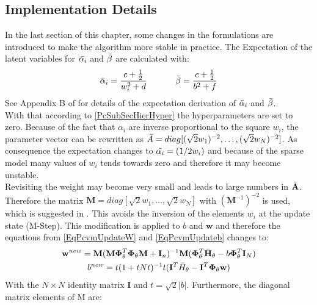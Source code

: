\subsection{Implementation Details}\label{PcSubSecImplementation}
In the last section of this chapter, some changes in the formulations are introduced to make the algorithm more stable in practice.
The Expectation of the latent variables for $\bar{\alpha_i}$ and $\bar{\beta}$ are calculated with:\cite{Chen.2009}
\begin{equation}\label{EqPcvmLatenHyp}
		\bar{\alpha}_i = \frac{c + \frac{1}{2}}{w_i^2 + d} \>\>\>\>\>\>\>\>\>\>\>\>\>\>\>
		\bar{\beta} = \frac{c + \frac{1}{2}}{b^2 + f}
\end{equation}
See Appendix B of \cite{Chen.2009} for details of the expectation derivation of $\bar{\alpha}_i$ and $\bar{\beta}$.\\
With that according to \ref{PcSubSecHierHyper} the hyperparameters are set to zero.
Because of the fact that $\alpha_i$ are inverse proportional to the square  $w_i$, the parameter vector can be rewritten as $\bar{A} = diag[(\sqrt{2}w_1)^{-2},\dots,(\sqrt{2}w_N)^{-2}]$.
As consequence the expectation changes to $\bar{\alpha_i} = (1/2w_i)$ and because of the sparse model many values of $w_i$ tends towards zero and therefore it may become unstable.\cite{Chen.2009}\\
Revisiting the weight may become very small and leads to large numbers in $\bar{\mathbf{A}}$. Therefore the matrix $\mathbf{M}=diag[\sqrt{2}w_1,\dots,\sqrt{2}w_N]$ with $(\mathbf{M}^{-1})^{-2}$ is used, which is suggested in \cite{Figueiredo.2003}.
This avoids the inversion of the elements $w_i$ at the update state (M-Step). This modification is applied to $b$ and $\mathbf{w}$ and therefore the equations from \ref{EqPcvmUpdateW} and \ref{EqPcvmUpdateb} changes to:\cite{Chen.2009}
\begin{equation}\label{EqPcvmStableUpdate}
	\begin{gathered}
	\mathbf{w}^{new} = \mathbf{M}(\mathbf{M \Phi}_\theta^T\mathbf{\Phi}_\theta\mathbf{M}+\mathbf{I}_n)^{-1} \mathbf{M}(\mathbf{\Phi}_\theta^T\bar{\mathbf{H}}_\theta - b \mathbf{\Phi}_\theta^T \mathbf{I}_N)\\
	b^{new} = t(1 + tNt)^{-1} t(\mathbf{I}^T\bar{H}_\theta-\mathbf{I}^T\mathbf{\Phi}_\theta\mathbf{w})
	\end{gathered}
\end{equation}
With the $N\times N$ identity matrix $\mathbf{I}$ and $t=\sqrt{2}|b|$.
Furthermore, the diagonal matrix elements of M are:
